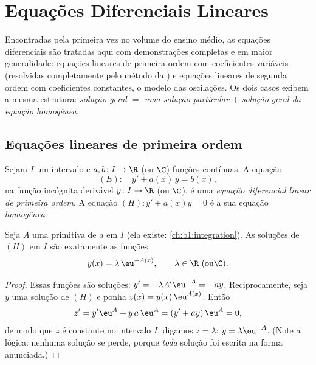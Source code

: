 \chapter{Equações Diferenciais Lineares}\label{ch:b1:diffeq}

Encontradas pela primeira vez no volume do ensino médio, as equações
diferenciais são tratadas aqui com demonstrações completas e em maior
generalidade: equações lineares de primeira ordem com coeficientes
variáveis (resolvidas completamente pelo método da ) e equações lineares de segunda ordem com coeficientes
constantes, o modelo das oscilações. Os dois casos exibem a mesma
estrutura: \emph{solução geral $=$ uma solução particular $+$ solução
geral da equação homogênea}.

\section{Equações lineares de primeira ordem}

\begin{definition}\label{def:b1:diffeq:linear1}
Sejam $I$ um intervalo e $a, b \colon I \to \R$ (ou $\C$)
funções contínuas. A equação
\[
(E)\colon\quad y' + a(x)\,y = b(x),
\]
na função incógnita derivável $y \colon I \to \R$ (ou $\C$),
é uma \emph{equação diferencial linear de primeira
ordem}. A
equação $(H)\colon y' + a(x) y = 0$ é a sua equação
\emph{homogênea}.
\end{definition}

\begin{theorem}\label{thm:b1:diffeq:homogeneous1}
Seja $A$ uma primitiva de $a$ em $I$ (ela existe:
\cref{ch:b1:integration}). As soluções de $(H)$ em $I$ são exatamente
as funções
\[
y(x) = \lambda\, \eu^{-A(x)}, \qquad \lambda \in \R \text{ (ou} \C).
\]
\end{theorem}

\begin{proof}
Essas funções são soluções: $y' = -\lambda A' \eu^{-A} = -a y$.
Reciprocamente, seja $y$ uma solução de $(H)$ e ponha $z(x) = y(x)\, \eu^{A(x)}$.
Então
\[
z' = y' \eu^{A} + y\, a\, \eu^{A} = (y' + ay)\, \eu^{A} = 0 ,
\]
de modo que $z$ é constante no intervalo $I$, digamos $z = \lambda$: $y =
\lambda \eu^{-A}$. (Note a lógica: nenhuma solução se perde, porque
\emph{toda} solução foi escrita na forma anunciada.)
\end{proof}

